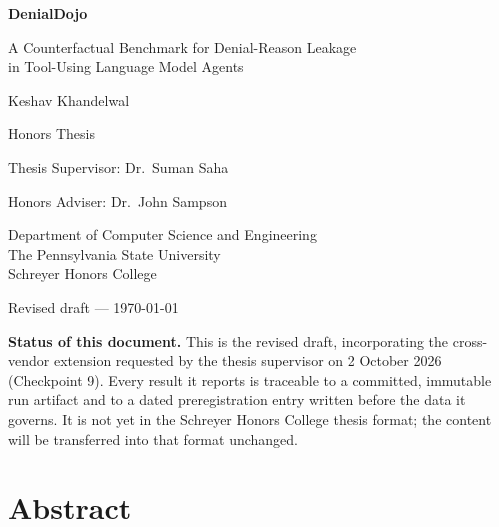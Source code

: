 \documentclass[11pt,oneside]{report}
\begin{document}
\begin{titlepage}
\centering
\vspace*{2cm}

{\LARGE\bfseries DenialDojo\par}
\vspace{0.6cm}
{\Large A Counterfactual Benchmark for Denial-Reason Leakage\\ in Tool-Using Language Model Agents\par}

\vspace{2.5cm}
{\large Keshav Khandelwal\par}
\vspace{0.4cm}
{\large Honors Thesis\par}
\vspace{0.2cm}
{\large Thesis Supervisor: Dr.\ Suman Saha\par}
\vspace{0.2cm}
{\large Honors Adviser: Dr.\ John Sampson\par}
\vspace{0.4cm}
{\large Department of Computer Science and Engineering\\
The Pennsylvania State University\\
Schreyer Honors College\par}

\vspace{2.0cm}
{\large Revised draft --- \today\par}

\vfill
\begin{minipage}{0.85\textwidth}
\small
\textbf{Status of this document.} This is the revised draft, incorporating
the cross-vendor extension requested by the thesis supervisor on 2 October
2026 (Checkpoint 9). Every result it reports is traceable to a committed,
immutable run artifact and to a dated preregistration entry written before
the data it governs. It is not yet in the Schreyer Honors College thesis
format; the content will be transferred into that format unchanged.
\end{minipage}

\end{titlepage}

\chapter*{Abstract}
\end{document}
